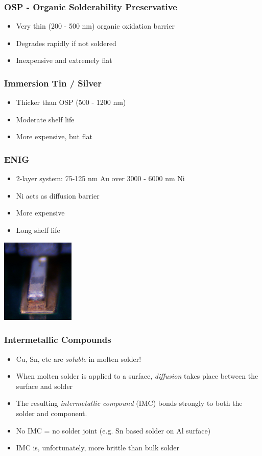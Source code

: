 \documentclass{beamer}
\begin{document}
\begin{frame}
\frametitle{OSP - Organic Solderability Preservative}
\begin{itemize}
\item Very thin (200 - 500 nm) organic oxidation barrier
\item Degrades rapidly if not soldered
\item Inexpensive and extremely flat
\end{itemize}
\end{frame}

\begin{frame}
\frametitle{Immersion Tin / Silver}
\begin{itemize}
\item Thicker than OSP (500 - 1200 nm)
\item Moderate shelf life
\item More expensive, but flat
\end{itemize}
\end{frame}

\begin{frame}
\frametitle{ENIG}
\begin{itemize}
\item 2-layer system: 75-125 nm Au over 3000 - 6000 nm Ni
\item Ni acts as diffusion barrier
\item More expensive
\item Long shelf life
\end{itemize}
\begin{center}
\includegraphics[height=4cm,keepaspectratio]{enig.jpg}
\end{center}
\end{frame}

\begin{frame}
\frametitle{Intermetallic Compounds}
\begin{itemize}
\item Cu, Sn, etc are \emph{soluble} in molten solder!
\item When molten solder is applied to a surface, \emph{diffusion} takes place between the surface and solder
\item The resulting \emph{intermetallic compound} (IMC) bonds strongly to both the solder and component.
\item No IMC = no solder joint (e.g. Sn based solder on Al surface)
\item IMC is, unfortunately, more brittle than bulk solder
\end{itemize}
\end{frame}
\end{document}
